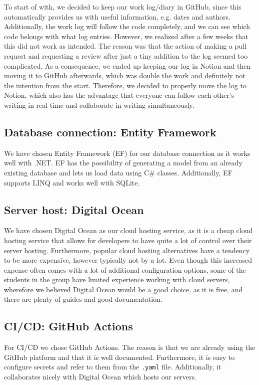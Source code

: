 To start of with, we decided to keep our work log/diary in GitHub, since this automatically provides us with useful information, e.g. dates and authors. Additionally, the work log will follow the code completely, and we can see which code belongs with what log entries. However, we realized after a few weeks that this did not work as intended. The reason was that the action of making a pull request and requesting a review after just a tiny addition to the log seemed too complicated.
As a consequence, we ended up keeping our log in Notion and then moving it to GitHub afterwards, which was double the work and definitely not the intention from the start.
Therefore, we decided to properly move the log to Notion, which also has the advantage that everyone can follow each other's writing in real time and collaborate in writing simultaneously.

\subsection{Database connection: Entity Framework}

We have chosen Entity Framework (EF) for our database connection as it works well with .NET. EF has the possibility of generating a model from an already existing database and lets us load data using C\# classes. Additionally, EF supports LINQ and works well with SQLite.

\subsection{Server host: Digital Ocean}

We have chosen Digital Ocean as our cloud hosting service, as it is a cheap cloud hosting service that allows for developers to have quite a lot of control over their server hosting. Furthermore, popular cloud hosting alternatives have a tendency to be more expensive, however typically not by a lot. Even though this increased expense often comes with a lot of additional configuration options, some of the students in the group have limited experience working with cloud servers, wherefore we believed Digital Ocean would be a good choice, as it is free, and there are plenty of guides and good documentation.

\subsection{CI/CD: GitHub Actions}

For CI/CD we chose GitHub Actions. The reason is that we are already using the GitHub platform and that it is well documented. Furthermore, it is easy to configure secrets and refer to them from the \texttt{.yaml} file. Additionally, it collaborates nicely with Digital Ocean which hosts our servers.

